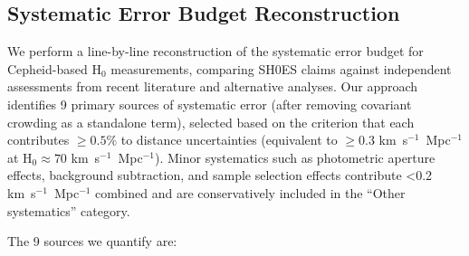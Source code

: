 \documentclass[preprint, linenumbers]{aastex701}
\begin{document}
\subsection{Systematic Error Budget Reconstruction} \label{sec:methods_budget}

We perform a line-by-line reconstruction of the systematic error budget for Cepheid-based H$_0$ measurements, comparing SH0ES claims \citep{Riess2022} against independent assessments from recent literature and alternative analyses. Our approach identifies 9 primary sources of systematic error (after removing covariant crowding as a standalone term), selected based on the criterion that each contributes $\ge 0.5\%$ to distance uncertainties (equivalent to $\ge 0.3$ km~s$^{-1}$~Mpc$^{-1}$ at H$_0 \approx 70$ km~s$^{-1}$~Mpc$^{-1}$). Minor systematics such as photometric aperture effects, background subtraction, and sample selection effects contribute <0.2 km~s$^{-1}$~Mpc$^{-1}$ combined and are conservatively included in the ``Other systematics'' category.

The 9 sources we quantify are:
\end{document}

